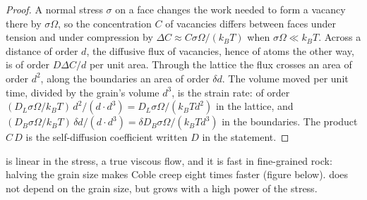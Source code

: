 \begin{proof}
A normal stress $\sigma$ on a face changes the work needed to form a vacancy
there by $\sigma\Omega$, so the concentration $C$ of vacancies differs between
faces under tension and under compression by $\Delta C \approx C\sigma\Omega/
(k_BT)$ when $\sigma\Omega \ll k_BT$. Across a distance of order $d$, the
diffusive flux of vacancies, hence of atoms the other way, is of order $D\Delta
C/d$ per unit area. Through the lattice the flux crosses an area of order
$d^2$, along the boundaries an area of order $\delta d$. The volume moved per
unit time, divided by the grain's volume $d^3$, is the strain rate: of order
$(D_L\sigma\Omega/k_BT)\,d^2/(d\cdot d^3) = D_L\sigma\Omega/(k_BTd^2)$ in the
lattice, and $(D_B\sigma\Omega/k_BT)\,\delta d/(d\cdot d^3) = \delta D_B
\sigma\Omega/(k_BTd^3)$ in the boundaries. The product $C\,D$ is the
self-diffusion coefficient written $D$ in the statement.
\end{proof}

 is linear in the stress, a true viscous flow, and it is fast in
fine-grained rock: halving the grain size makes Coble creep eight times faster
(figure below).  does not depend on the grain size, but grows
with a high power of the stress.


